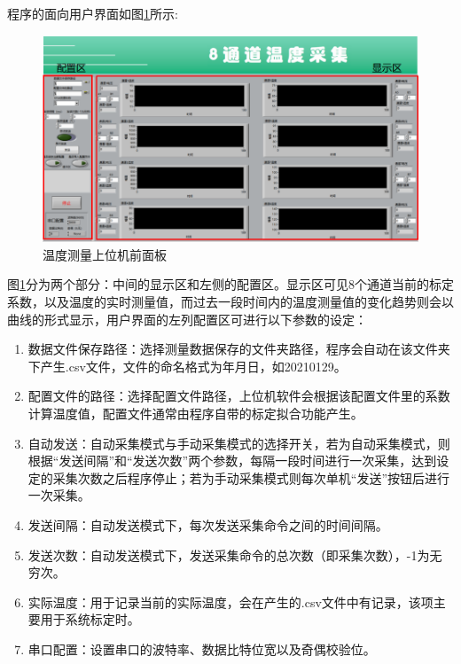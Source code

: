 程序的面向用户界面如图\ref{fig:温度测量上位机前面板}所示:
\begin{figure}[htb]
    \centering
    \includegraphics[width=14cm]{fig/3-fig/温度采集上位机前面板.png}
    \caption{温度测量上位机前面板}
    \label{fig:温度测量上位机前面板}
\end{figure}

图\ref{fig:温度测量上位机前面板}分为两个部分：中间的显示区和左侧的配置区。显示区可见8个通道当前的标定系数，以及温度的实时测量值，而过去一段时间内的温度测量值的变化趋势则会以曲线的形式显示，用户界面的左列配置区可进行以下参数的设定：
\begin{enumerate}
    \item 数据文件保存路径：选择测量数据保存的文件夹路径，程序会自动在该文件夹下产生.csv文件，文件的命名格式为年月日，如20210129。
    \item 配置文件的路径：选择配置文件路径，上位机软件会根据该配置文件里的系数计算温度值，配置文件通常由程序自带的标定拟合功能产生。
    \item 自动发送：自动采集模式与手动采集模式的选择开关，若为自动采集模式，则根据“发送间隔”和“发送次数”两个参数，每隔一段时间进行一次采集，达到设定的采集次数之后程序停止；若为手动采集模式则每次单机“发送”按钮后进行一次采集。
    \item 发送间隔：自动发送模式下，每次发送采集命令之间的时间间隔。
    \item 发送次数：自动发送模式下，发送采集命令的总次数（即采集次数），-1为无穷次。
    \item 实际温度：用于记录当前的实际温度，会在产生的.csv文件中有记录，该项主要用于系统标定时。
    \item 串口配置：设置串口的波特率、数据比特位宽以及奇偶校验位。
  \end{enumerate}

